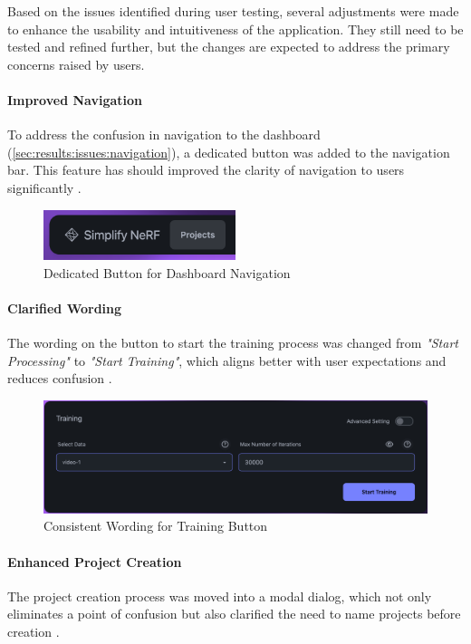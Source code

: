 Based on the issues identified during user testing, several adjustments were made to enhance the usability and intuitiveness of the application.
They still need to be tested and refined further, but the changes are expected to address the primary concerns raised by users.

\paragraph{Improved Navigation}
To address the confusion in navigation to the dashboard (\ref{sec:results:issues:navigation}), a dedicated button was added to the navigation bar.
This feature has should improved the clarity of  navigation to users significantly .

\begin{figure}[htb]
  \centering
	\includegraphics[width=0.5\textwidth]{figures/fix-1.png}
	\caption{Dedicated Button for Dashboard Navigation}
  \label{fig:fix-1}
\end{figure}

\paragraph{Clarified Wording}
The wording on the button to start the training process was changed from \emph{"Start Processing"} to \emph{"Start Training"}, which aligns better with user expectations and reduces confusion .

\begin{figure}[htb]
	\includegraphics[width=\textwidth]{figures/fix-2.png}
	\caption{Consistent Wording for Training Button}
  \label{fig:fix-2}
\end{figure}

\paragraph{Enhanced Project Creation}
The project creation process was moved into a modal dialog, which not only eliminates a point of confusion but also clarified the need to name projects before creation .

